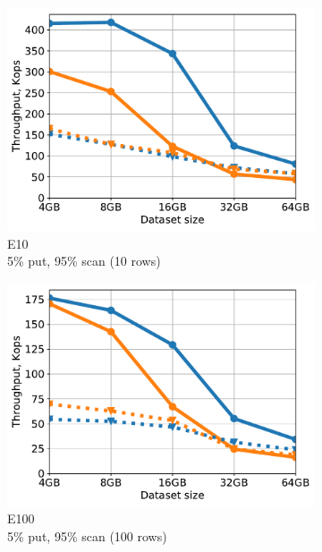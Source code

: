 \begin{figure}[tb]
\begin{subfigure}{0.3\linewidth}
\includegraphics[width=\textwidth]{figs/Workload_E-_line.pdf}
\caption{E10 \\ 5\% put, 95\% scan (10 rows)}
\label{fig:throughput:e10}
\end{subfigure}
\begin{subfigure}{0.3\linewidth}
\includegraphics[width=\textwidth]{figs/Workload_E_line.pdf}
\caption{E100 \\ 5\% put, 95\% scan (100 rows)}
\label{fig:throughput:e100}
\end{subfigure}
\begin{subfigure}{0.3\linewidth}

\end{subfigure}
\end{figure}
